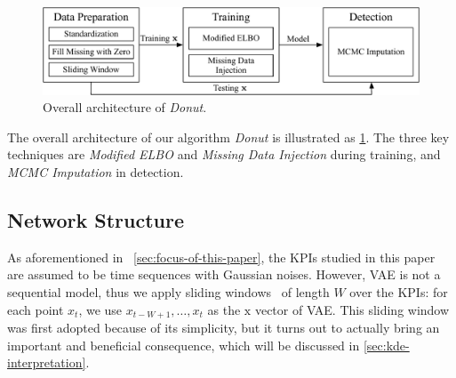 \documentclass[sigconf]{acmart}
\newcommand\compactvspace[1]{\vspace{#1}}
\newcommand\compactvspace[1]{}
\newcommand{\DONUT}{\textit{Donut}}
\newcommand{\vv}[1]{\bm{\mathrm{{#1}}}}
\begin{document}
\begin{figure}
	\centering
	\includegraphics[width=\columnwidth]{architecture}
	\caption{
		Overall architecture of \DONUT{}.
	}\label{fig:architecture}
\end{figure}

The overall architecture of our algorithm \DONUT{} is illustrated as \cref{fig:architecture}. The three key techniques are \textit{Modified ELBO} and \textit{Missing Data Injection} during training, and \textit{MCMC Imputation} in detection.

\compactvspace{-.5em}
\subsection{Network Structure}
\label{sec:network-structure}

As aforementioned in ~\cref{sec:focus-of-this-paper}, the KPIs studied in this paper are assumed to be time sequences with Gaussian noises.
However, VAE is not a sequential model, thus we apply sliding windows~\cite{sejnowski1987parallel} of length $W$ over the KPIs: for each point $x_t$, we use $x_{t-W+1}, \dots, x_t$ as the $\vv{x}$ vector of VAE.
This sliding window was first adopted because of its simplicity, but it turns out to actually bring an important and beneficial consequence, which will be discussed in \cref{sec:kde-interpretation}.
\end{document}
